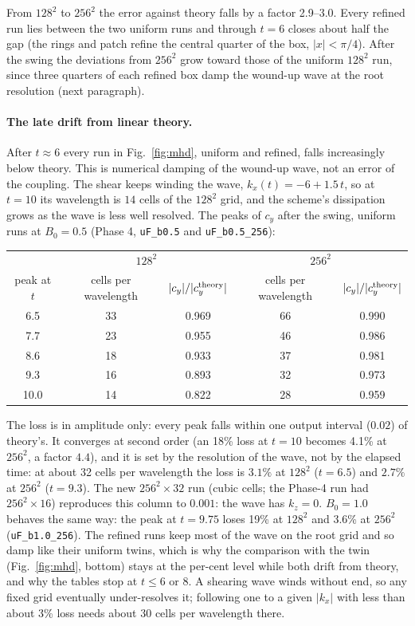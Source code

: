 \documentclass[11pt]{article}
\newcommand{\code}[1]{\texttt{#1}}
\begin{document}
\noindent
From $128^2$ to $256^2$ the error against theory falls by a factor 2.9--3.0. Every refined
run lies between the two uniform runs and through $t = 6$ closes about half the gap (the
rings and patch refine the central quarter of the box, $|x| < \pi/4$). After the swing
the deviations from $256^2$ grow toward those of the uniform $128^2$ run, since three
quarters of each refined box damp the wound-up wave at the root resolution (next paragraph).

\paragraph{The late drift from linear theory.} After $t \approx 6$ every run in
Fig.~\ref{fig:mhd}, uniform and refined, falls increasingly below theory. This is numerical
damping of the wound-up wave, not an error of the coupling. The shear keeps winding the wave,
$k_x(t) = -6 + 1.5\,t$, so at $t = 10$ its wavelength is $14$ cells of the $128^2$ grid, and
the scheme's dissipation grows as the wave is less well resolved. The peaks of $c_y$ after
the swing, uniform runs at $B_0 = 0.5$ (Phase 4, \code{uF\_b0.5} and \code{uF\_b0.5\_256}):

\begin{center}
\small
\begin{tabular}{@{}ccccc@{}}
\toprule
& \multicolumn{2}{c}{$128^2$} & \multicolumn{2}{c}{$256^2$} \\
peak at $t$ & cells per wavelength & $|c_y|/|c_y^{\rm theory}|$ &
  cells per wavelength & $|c_y|/|c_y^{\rm theory}|$ \\
\midrule
6.5  & 33 & 0.969 & 66 & 0.990 \\
7.7  & 23 & 0.955 & 46 & 0.986 \\
8.6  & 18 & 0.933 & 37 & 0.981 \\
9.3  & 16 & 0.893 & 32 & 0.973 \\
10.0 & 14 & 0.822 & 28 & 0.959 \\
\bottomrule
\end{tabular}
\end{center}

\noindent
The loss is in amplitude only: every peak falls within one output interval ($0.02$) of
theory's. It converges at second order (an 18\% loss at $t = 10$ becomes 4.1\% at $256^2$,
a factor $4.4$), and it is set by the resolution of the wave, not by the elapsed time: at
about 32 cells per wavelength the loss is $3.1\%$ at $128^2$ ($t = 6.5$) and $2.7\%$ at
$256^2$ ($t = 9.3$). The new $256^2\times32$ run (cubic cells; the Phase-4 run had
$256^2\times16$) reproduces this column to $0.001$: the wave has $k_z = 0$. $B_0 = 1.0$
behaves the same way: the peak at $t = 9.75$ loses 19\% at $128^2$ and 3.6\% at $256^2$
(\code{uF\_b1.0\_256}). The refined runs keep most of the wave on the root grid and so damp like their
uniform twins, which is why the comparison with the twin (Fig.~\ref{fig:mhd}, bottom) stays
at the per-cent level while both drift from theory, and why the tables stop at $t \le 6$ or
$8$. A shearing wave winds without end, so any fixed grid eventually under-resolves it;
following one to a given $|k_x|$ with less than about 3\% loss needs about 30 cells per
wavelength there.
\end{document}
